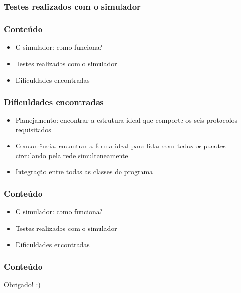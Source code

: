 \documentclass{beamer}
\begin{document}
\begin{frame}
	\frametitle{Testes realizados com o simulador}
\end{frame}

\begin{frame}
	\frametitle{Conteúdo}
	\begin{itemize}
		\item \textcolor{covered}{O simulador: como funciona?}
		\item \textcolor{covered}{Testes realizados com o simulador}
		\item Dificuldades encontradas
	\end{itemize}
\end{frame}

\begin{frame}
	\frametitle{Dificuldades encontradas}
	\begin{itemize}
		\item Planejamento: encontrar a estrutura ideal que comporte os seis protocolos requisitados
		\item Concorrência: encontrar a forma ideal para lidar com todos os pacotes circulando pela rede simultaneamente
		\item Integração entre todas as classes do programa
	\end{itemize}
\end{frame}

\begin{frame}
	\frametitle{Conteúdo}
	\begin{itemize}
		\item \textcolor{covered}{O simulador: como funciona?}
		\item \textcolor{covered}{Testes realizados com o simulador}
		\item \textcolor{covered}{Dificuldades encontradas}
	\end{itemize}
\end{frame}

\begin{frame}
	\frametitle{Conteúdo}
	\begin{center}
	Obrigado! :)
	\end{center}
\end{frame}
\end{document}
